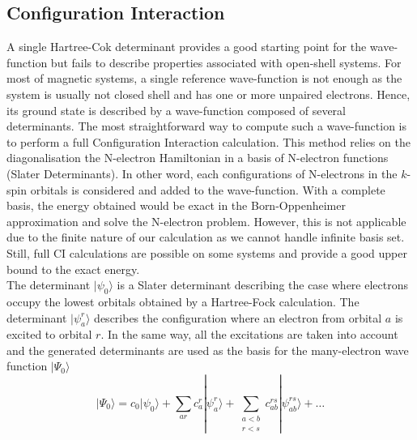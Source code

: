 \documentclass[12pt]{report}
\numberwithin{equation}{section}
\begin{document}
\subsection{Configuration Interaction}

A single Hartree-Cok determinant provides a good starting point for the wave-function but fails to describe properties associated with open-shell systems.
For most of magnetic systems, a single reference wave-function is not enough as the system is usually not closed shell and has one or more unpaired electrons.
Hence, its ground state is described by a wave-function composed of several determinants.
The most straightforward way to compute such a wave-function is to perform a full Configuration Interaction calculation.
This method relies on the diagonalisation the N-electron Hamiltonian in a basis of N-electron functions (Slater Determinants).
In other word, each configurations of N-electrons in the $k$-spin orbitals is considered and added to the wave-function.
With a complete basis, the energy obtained would be exact in the Born-Oppenheimer approximation and solve the N-electron problem.
However, this is not applicable due to the finite nature of our calculation as we cannot handle infinite basis set.
Still, full CI calculations are possible on some systems and provide a good upper bound to the exact energy. \\
The determinant $|\psi_0\rangle$ is a Slater determinant describing the case where electrons occupy the lowest orbitals obtained by a Hartree-Fock calculation.
The determinant $|\psi_a^r\rangle$ describes the configuration where an electron from orbital $a$ is excited to orbital $r$.
In the same way, all the excitations are taken into account and the generated determinants are used as the basis for the many-electron wave function $|\Psi_0\rangle$
\begin{equation}\label{eq:FullCI}
    | \Psi_0 \rangle = c_0 |\psi_0 \rangle + \sum_{ar} c_a^r |\psi_a^r \rangle + \sum_{\substack{a<b\\ r<s}} c_{ab}^{rs} |\psi_{ab}^{rs} \rangle + \ldots
\end{equation}
\end{document}
